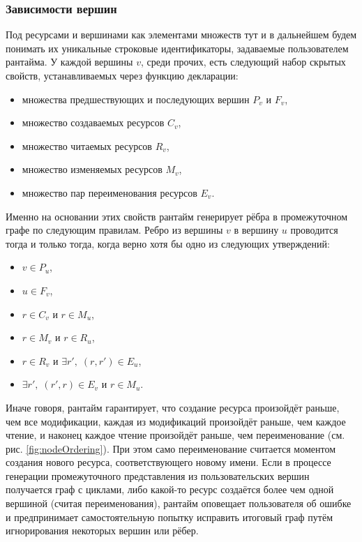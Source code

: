 \subsubsection{Зависимости вершин}
Под ресурсами и вершинами как элементами множеств тут и в дальнейшем будем понимать их уникальные строковые идентификаторы, задаваемые пользователем рантайма.
У каждой вершины $v$, среди прочих, есть следующий набор скрытых свойств, устанавливаемых через функцию декларации:
\begin{itemize}
    \item множества предшествующих и последующих вершин $P_v$ и $F_v$,
    \item множество создаваемых ресурсов $C_v$,
    \item множество читаемых ресурсов $R_v$,
    \item множество изменяемых ресурсов $M_v$,
    \item множество пар переименования ресурсов $E_v$.
\end{itemize}
Именно на основании этих свойств рантайм генерирует рёбра в промежуточном графе по следующим правилам.
Ребро из вершины $v$ в вершину $u$ проводится тогда и только тогда, когда верно хотя бы одно из следующих утверждений:
\begin{itemize}
    \item $v\in P_u$,
    \item $u\in F_v$,
    \item $r \in C_v$ и $r \in M_u$,
    \item $r \in M_v$ и $r \in R_u$,
    \item $r \in R_v$ и $\exists r',\;(r, r') \in E_u$,
    \item $\exists r',\;(r', r) \in E_v$ и $r \in M_u$.
\end{itemize}
Иначе говоря, рантайм гарантирует, что создание ресурса произойдёт раньше, чем все модификации, каждая из модификаций произойдёт раньше, чем каждое чтение, и наконец каждое чтение произойдёт раньше, чем переименование (см. рис. \ref{fig:nodeOrdering}).
При этом само переименование считается моментом создания нового ресурса, соответствующего новому имени.
Если в процессе генерации промежуточного представления из пользовательских вершин получается граф с циклами, либо какой-то ресурс создаётся более чем одной вершиной (считая переименования), рантайм оповещает пользователя об ошибке и предпринимает самостоятельную попытку исправить итоговый граф путём игнорирования некоторых вершин или рёбер.

